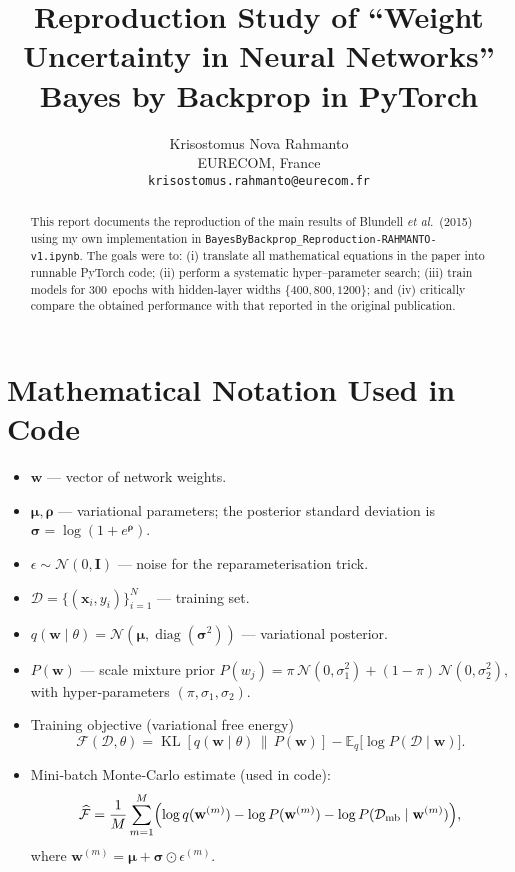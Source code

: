 \documentclass{article}
\title{Reproduction Study of ``Weight Uncertainty in Neural Networks''\\Bayes by Backprop in PyTorch}
\author{Krisostomus Nova Rahmanto \\ EURECOM, France \\ \texttt{krisostomus.rahmanto@eurecom.fr}}
\begin{document}
\maketitle

\begin{abstract}
This report documents the reproduction of the main results of Blundell \emph{et al.}\ (2015) using my own implementation in \texttt{BayesByBackprop\_Reproduction-RAHMANTO-v1.ipynb}. %
The goals were to: (i) translate all mathematical equations in the paper into runnable PyTorch code; (ii) perform a systematic hyper--parameter search; (iii) train models for 300~epochs with hidden‑layer widths $\{400,800,1200\}$; and (iv) critically compare the obtained performance with that reported in the original publication.
\end{abstract}

\section{Mathematical Notation Used in Code}
\vspace{-0.3em}
\begin{itemize}
\item $\mathbf{w}$ --- vector of network weights.
\item $\boldsymbol{\mu},\boldsymbol{\rho}$ --- variational parameters; the posterior standard deviation is $\boldsymbol{\sigma}=\log (1+e^{\boldsymbol{\rho}})$.
\item $\epsilon\sim\mathcal{N}(0,\mathbf{I})$ --- noise for the reparameterisation trick.
\item $\mathcal{D}=\{(\mathbf{x}_i,y_i)\}_{i=1}^N$ --- training set.
\item $q(\mathbf{w}\mid\theta)=\mathcal{N}(\boldsymbol{\mu},\operatorname{diag}(\boldsymbol{\sigma}^2))$ --- variational posterior.
\item $P(\mathbf{w})$ --- scale mixture prior
$
P(w_j)=\pi\,\mathcal{N}(0,\sigma_1^2)+(1-\pi)\,\mathcal{N}(0,\sigma_2^2),
$
with hyper‑parameters $(\pi,\sigma_1,\sigma_2)$.
\item Training objective (variational free energy)
\[
\mathcal{F}(\mathcal{D},\theta)=\operatorname{KL}\!\left[q(\mathbf{w}\mid\theta)\,\bigl\|\,P(\mathbf{w})\right]-\mathbb{E}_{q}\bigl[\log P(\mathcal{D}\mid\mathbf{w})\bigr].
\]
\item Mini‑batch Monte‑Carlo estimate (used in code):
\[
\widehat{\mathcal{F}}=\frac{1}{M}\sum_{m=1}^M
\Bigl(\log q(\mathbf{w}^{(m)})-\log P(\mathbf{w}^{(m)})-\log P(\mathcal{D}_\text{mb}\mid\mathbf{w}^{(m)})\Bigr),
\]
where $\mathbf{w}^{(m)}=\boldsymbol{\mu}+\boldsymbol{\sigma}\odot\epsilon^{(m)}$.
\end{itemize}
\end{document}
